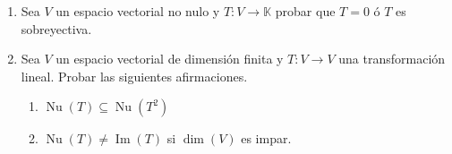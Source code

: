 \begin{enumerate}[topsep=6pt, itemsep=.4cm]
    \rta



    \item \label{funcionales} Sea $V$ un espacio vectorial no nulo y $T:V\longrightarrow\mathbb{K}$ probar que $T=0$ ó $T$ es sobreyectiva.
    
    \rta


    \item Sea $V$ un espacio vectorial de dimensión finita y $T:V\longrightarrow V$ una transformación lineal. Probar las siguientes afirmaciones.
        \begin{multicols}{2}
            \begin{enumerate}
                \item $\operatorname{Nu}(T)\subseteq\operatorname{Nu}(T^2)$
                \item\label{dimV impar} $\operatorname{Nu}(T)\neq\operatorname{Im}(T)$ si $\dim(V)$ es impar.
            \end{enumerate}
        \end{multicols}
    
    \rta
        
    \end{enumerate}